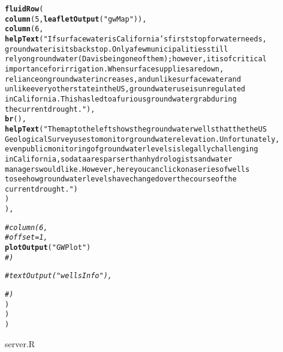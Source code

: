 \documentclass[english]{article}\usepackage[]{graphicx}\usepackage[]{color}
\makeatletter
\newcommand{\hlnum}[1]{\textcolor[rgb]{0.686,0.059,0.569}{#1}}%
\newcommand{\hlstr}[1]{\textcolor[rgb]{0.192,0.494,0.8}{#1}}%
\newcommand{\hlcom}[1]{\textcolor[rgb]{0.678,0.584,0.686}{\textit{#1}}}%
\newcommand{\hlstd}[1]{\textcolor[rgb]{0.345,0.345,0.345}{#1}}%
\newcommand{\hlkwd}[1]{\textcolor[rgb]{0.737,0.353,0.396}{\textbf{#1}}}%
\newenvironment{kframe}{%
 \def\at@end@of@kframe{}%
 \ifinner\ifhmode%
  \def\at@end@of@kframe{\end{minipage}}%
  \begin{minipage}{\columnwidth}%
 \fi\fi%
 \def\FrameCommand##1{\hskip\@totalleftmargin \hskip-\fboxsep
 \colorbox{shadecolor}{##1}\hskip-\fboxsep
     \hskip-\linewidth \hskip-\@totalleftmargin \hskip\columnwidth}%
 \MakeFramed {\advance\hsize-\width
   \@totalleftmargin\z@ \linewidth\hsize
   \@setminipage}}%
 {\par\unskip\endMakeFramed%
 \at@end@of@kframe}
\newenvironment{knitrout}{}{} %
\makeatother
\begin{document}
\begin{knitrout}
\begin{kframe}
\begin{alltt}
      \hlkwd{fluidRow}\hlstd{(}
        \hlkwd{column}\hlstd{(}\hlnum{5}\hlstd{,} \hlkwd{leafletOutput}\hlstd{(}\hlstr{"gwMap"}\hlstd{)),}
        \hlkwd{column}\hlstd{(}\hlnum{6}\hlstd{,}
               \hlkwd{helpText}\hlstd{(}\hlstr{"If surface water is California's first stop for water needs, 
               groundwater is its backstop. Only a few municipalities still
               rely on groundwater (Davis being one of them); however, it is of critical 
               importance for irrigation. When surface supplies are down, 
               reliance on groundwater increases, and unlike surface water and 
               unlike every other state in the US, groundwater use is unregulated
               in California. This has led to a furious groundwater grab during
               the current drought."}\hlstd{),}
               \hlkwd{br}\hlstd{(),}
               \hlkwd{helpText}\hlstd{(}\hlstr{"The map to the left shows the groundwater wells that the the US 
               Geological Survey uses to monitor groundwater elevation. Unfortunately,
               even public monitoring of groundwater levels is legally challenging
               in California, so data are sparser than hydrologists and water
               managers would like. However, here you can click on a series of wells 
               to see how groundwater levels have changed over the course of the 
               current drought."}\hlstd{)}
        \hlstd{)}
      \hlstd{),}

      \hlcom{#        column(6, }
      \hlcom{#               offset = 1,}
      \hlkwd{plotOutput}\hlstd{(}\hlstr{"GWPlot"}\hlstd{)}
      \hlcom{#        )}

      \hlcom{#      textOutput("wellsInfo"),}

      \hlcom{#      )}
    \hlstd{)}
  \hlstd{)}
\hlstd{)}
\end{alltt}
\end{kframe}
\end{knitrout}

server.R
\end{document}
